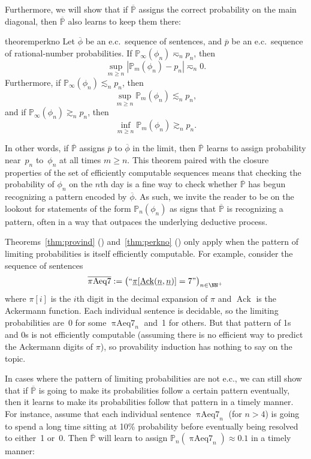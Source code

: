 \documentclass[authordate,onecolumn,noenvironments]{miri-tech-article}
\numberwithin{equation}{subsection}
\newcommand{\quot}[1]{``#1"}
\newcommand{\enc}[1]{{\underline{#1}}}
\newcommand{\seq}[1]{{\overline{#1}}}
\newcommand{\Ack}{\operatorname{Ack}}
\newcommand{\prob}{p}
\newcommand{\mm}{m}
\newcommand{\nn}{n}
\newcommand{\phis}{\seq{\phi}}
\newcommand{\probs}{\seq{{\prob}}}
\newcommand{\ec}[1][\ ]{e.c.#1}
\newcommand{\rparenthetical}[1]{\hfill\upshape{{\small (#1)}}} %
\newcommand{\proofin}[1]{\rparenthetical{Proof in:~#1.}}
\newcommand{\BelState}{\mathbb{P}}
\newcommand{\pt}{\BelState}
\newcommand{\MP}{\seq{\pt}}
\newcommand{\piasev}{\mathit{\operatorname{\pi Aeq7}}}
\begin{document}
Furthermore, we will show that if $\MP$ assigns the correct probability on the main diagonal, then $\MP$ also learns to keep them there:

\begin{restatable}{theorem}{perkno}\label{thm:perkno}
  Let $\phis$ be an \ec sequence of sentences, and $\probs$ be an \ec sequence of rational-number probabilities. If $\pt_\infty(\phi_\nn)\eqsim_\nn \prob_\nn$, then
  \[
    \sup_{\mm\ge\nn}|\pt_\mm(\phi_\nn)-\prob_\nn|\eqsim_\nn 0.
  \] 
  Furthermore, if $\pt_\infty(\phi_\nn)\lesssim_\nn \prob_\nn$, then
  \[
    \sup_{\mm\geq \nn}\pt_\mm(\phi_\nn)\lesssim_\nn \prob_\nn,
  \]
  and if $\pt_\infty(\phi_\nn)\gtrsim_\nn \prob_\nn$, then
  \[
   \inf_{\mm\geq \nn}\pt_\mm(\phi_\nn)\gtrsim_\nn \prob_\nn.
  \]
  \proofin{\ref{app:perkno}}
\end{restatable}
\noindent In other words, if $\MP$ assigns $\probs$ to $\phis$ in the limit, then $\MP$ learns to assign probability near~$\prob_\nn$ to~$\phi_\nn$ at all times $\mm \ge \nn$. This theorem paired with the closure properties of the set of efficiently computable sequences means that checking the probability of $\phi_\nn$ on the $\nn$th day is a fine way to check whether $\MP$ has begun recognizing a pattern encoded by $\phis$. As such, we invite the reader to be on the lookout for statements of the form $\pt_\nn(\phi_\nn)$ as signs that $\MP$ is recognizing a pattern, often in a way that outpaces the underlying deductive process.

Theorems~\ref{thm:provind} () and~\ref{thm:perkno} () only apply when the pattern of limiting probabilities is itself efficiently computable. For example, consider the sequence of sentences
\[
  \seq{\piasev} := \big(\quot{\enc{\pi}[\enc{\Ack}(\enc{\nn}, \enc{\nn})] = 7}\big)_{\nn\in {\NN^+}}
\]
where $\pi[i]$ is the $i$th digit in the decimal expansion of $\pi$ and $\Ack$ is the Ackermann function. Each individual sentence is decidable, so the limiting probabilities are~0 for some $\piasev_\nn$ and~1 for others. But that pattern of 1s and 0s is not efficiently computable (assuming there is no efficient way to predict the Ackermann digits of $\pi$), so provability induction has nothing to say on the topic.

In cases where the pattern of limiting probabilities are not \ec[,] we can still show that if $\MP$ is going to make its probabilities follow a certain pattern eventually, then it learns to make its probabilities follow that pattern in a timely manner. For instance, assume that each individual sentence $\piasev_\nn$ (for $n > 4$) is going to spend a long time sitting at 10\% probability before eventually being resolved to either~1 or~0. Then $\MP$ will learn to assign $\pt_\nn(\piasev_\nn) \approx 0.1$ in a timely manner:
\end{document}
